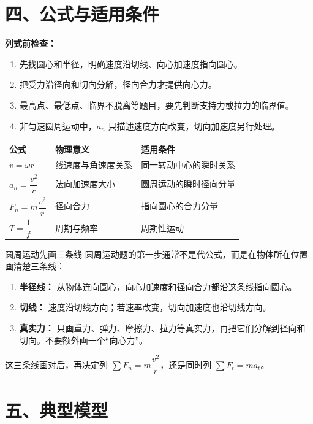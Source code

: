 \section*{四、公式与适用条件}

\textbf{列式前检查：}
\begin{enumerate}
  \item 先找圆心和半径，明确速度沿切线、向心加速度指向圆心。
  \item 把受力沿径向和切向分解，径向合力才提供向心力。
  \item 最高点、最低点、临界不脱离等题目，要先判断支持力或拉力的临界值。
  \item 非匀速圆周运动中，$a_n$ 只描述速度方向改变，切向加速度另行处理。
\end{enumerate}

\begin{center}
\begin{tabular}{lll}
\toprule
公式 & 物理意义 & 适用条件 \\
\midrule
$v = \omega r$ & 线速度与角速度关系 & 同一转动中心的瞬时关系 \\
$a_n = \dfrac{v^2}{r}$ & 法向加速度大小 & 圆周运动的瞬时径向分量 \\
$F_n = m\dfrac{v^2}{r}$ & 径向合力 & 指向圆心的合力分量 \\
$T = \dfrac{1}{f}$ & 周期与频率 & 周期性运动 \\
\bottomrule
\end{tabular}
\end{center}

\begin{learningbox}{圆周运动先画三条线}
圆周运动题的第一步通常不是代公式，而是在物体所在位置画清楚三条线：
\begin{enumerate}
  \item \textbf{半径线：} 从物体连向圆心，向心加速度和径向合力都沿这条线指向圆心。
  \item \textbf{切线：} 速度沿切线方向；若速率改变，切向加速度也沿切线方向。
  \item \textbf{真实力：} 只画重力、弹力、摩擦力、拉力等真实力，再把它们分解到径向和切向。不要额外画一个“向心力”。
\end{enumerate}
这三条线画对后，再决定列 $\sum F_n=m\dfrac{v^2}{r}$，还是同时列 $\sum F_t=ma_t$。
\end{learningbox}

\section*{五、典型模型}


